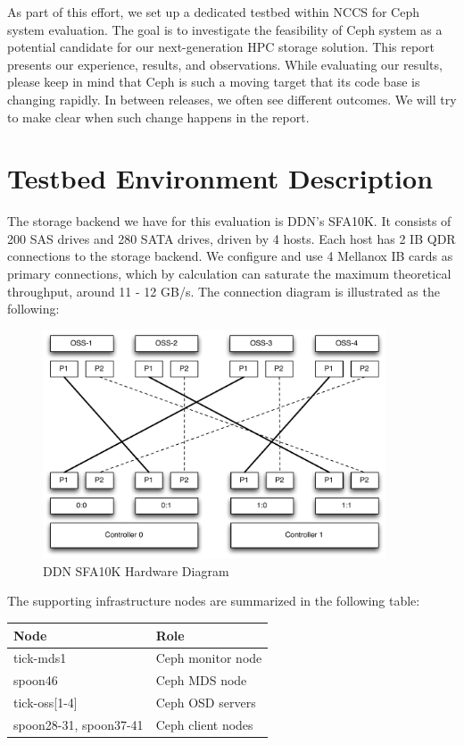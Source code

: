 \documentclass{article}
\begin{document}
As part of this effort, we set up a dedicated testbed within NCCS for Ceph
system evaluation. The goal is to investigate the feasibility of Ceph system as
a potential candidate for our next-generation HPC storage solution.
This report presents our experience, results, and observations. While evaluating
our results, please keep in mind that Ceph is such a moving target that its
code base is changing rapidly. In between releases, we often see different
outcomes. We will try to make clear when such change happens in the report.

\section{Testbed Environment Description}

The storage backend we have for this evaluation is DDN's SFA10K. It consists of
200 SAS drives and 280 SATA drives, driven by 4 hosts. Each host has 2 IB QDR
connections to the storage backend. We configure and use 4 Mellanox IB cards as
primary connections, which by calculation can saturate the maximum theoretical
throughput, around 11 - 12 GB/s. The connection diagram is illustrated as the
following:

\begin{figure}[htb]
\centering
\includegraphics[width=4in]{figs/sfa10k}
\caption{DDN SFA10K Hardware Diagram}
\end{figure}


The supporting infrastructure nodes are summarized in the following table:

\begin{table}[H]
\centering
    \begin{tabular}{ll}
    \toprule
    Node & Role \\
    \midrule
    tick-mds1 & Ceph monitor node \\
    spoon46 & Ceph MDS node \\
    tick-oss[1-4] & Ceph OSD servers \\
    spoon28-31, spoon37-41 & Ceph client nodes \\
    \bottomrule

    \end{tabular}

\end{table}
\end{document}
